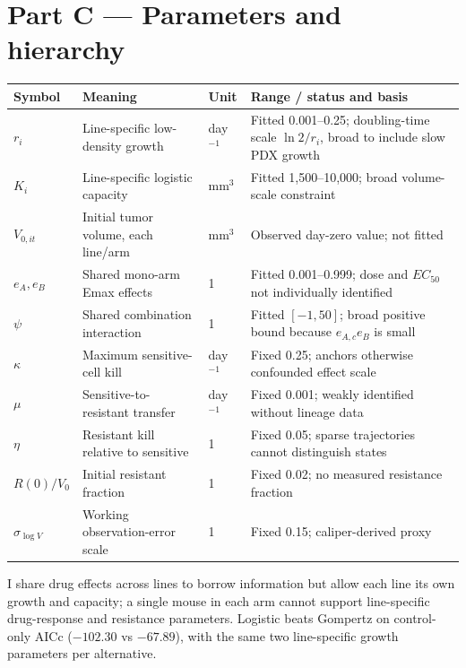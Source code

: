 \documentclass[10pt,a4paper]{article}
\begin{document}
\section*{Part C — Parameters and hierarchy}
\small
\begin{center}\begin{tabular}{p{.12\linewidth}p{.38\linewidth}p{.12\linewidth}p{.26\linewidth}}
\toprule Symbol & Meaning & Unit & Range / status and basis\\\midrule
$r_i$ & Line-specific low-density growth & day$^{-1}$ & Fitted 0.001--0.25; doubling-time scale $\ln2/r_i$, broad to include slow PDX growth\\
$K_i$ & Line-specific logistic capacity & mm$^3$ & Fitted 1,500--10,000; broad volume-scale constraint\\
$V_{0,it}$ & Initial tumor volume, each line/arm & mm$^3$ & Observed day-zero value; not fitted\\
$e_A,e_B$ & Shared mono-arm Emax effects & 1 & Fitted 0.001--0.999; dose and $EC_{50}$ not individually identified\\
$\psi$ & Shared combination interaction & 1 & Fitted $[-1,50]$; broad positive bound because $e_{A,c}e_B$ is small\\
$\kappa$ & Maximum sensitive-cell kill & day$^{-1}$ & Fixed 0.25; anchors otherwise confounded effect scale\\
$\mu$ & Sensitive-to-resistant transfer & day$^{-1}$ & Fixed 0.001; weakly identified without lineage data\\
$\eta$ & Resistant kill relative to sensitive & 1 & Fixed 0.05; sparse trajectories cannot distinguish states\\
$R(0)/V_0$ & Initial resistant fraction & 1 & Fixed 0.02; no measured resistance fraction\\
$\sigma_{\log V}$ & Working observation-error scale & 1 & Fixed 0.15; caliper-derived proxy \cite{euhus}\\
\bottomrule\end{tabular}\end{center}
\normalsize
I share drug effects across lines to borrow information but allow each line its own growth and capacity; a single mouse in each arm cannot support line-specific drug-response and resistance parameters. Logistic beats Gompertz on control-only AICc ($-102.30$ vs $-67.89$), with the same two line-specific growth parameters per alternative.

\clearpage
\end{document}
